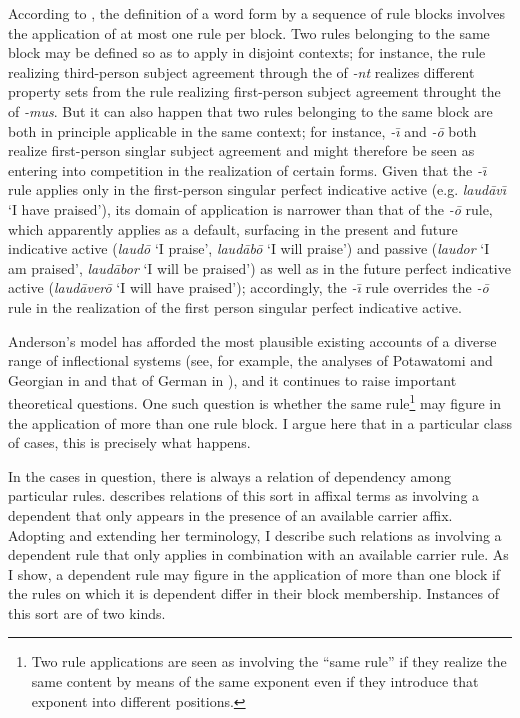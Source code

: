 \documentclass[output=paper,
modfonts
]{LSP/langsci}
\begin{document}
  According to , the definition of a word form by a sequence of rule blocks involves the application of at most one rule per block.  Two rules belonging to the same block may be defined so as to apply in disjoint contexts; for instance, the rule realizing third-person  subject agreement through the  of \textit{{}-nt} realizes different property sets from the rule realizing first-person  subject agreement throught the  of \textit{{}-mus}.  But it can also happen that two rules belonging to the same block are both in principle applicable in the same context; for instance, \textit{{}-\=\i} and \textit{{}-\=o} both realize first-person singlar subject agreement and might therefore be seen as entering into competition in the realization of certain forms.  Given that the \textit{{}-\=\i} rule\textit{} applies only in the first-person singular perfect indicative active (e.g.\textit{} \textit{laud\=av\=\i} ‘I have praised’), its domain of application is narrower than that of the \textit{{}-\=o} rule, which apparently applies as a default, surfacing in the present and future indicative active (\textit{laud\=o} ‘I praise’, \textit{laud\=ab\=o} ‘I will praise’) and passive (\textit{laudor} ‘I am praised’, \textit{laud\=abor} ‘I will be praised’) as well as in the future perfect indicative active (\textit{laud\=aver\=o} ‘I will have praised’); accordingly, the \textit{{}-\=\i} rule overrides the \textit{{}-\=o} rule in the realization of the first person singular perfect indicative active.

Anderson’s model has afforded the most plausible existing accounts of a diverse range of inflectional systems (see, for example, the analyses of Potawatomi and Georgian in \citealt{Anderson1977a,Anderson1984,Anderson1986} and that of German in \citealt{Zwicky1985a}), and it continues to raise important theoretical questions. One such question is whether the same rule\footnote{Two rule applications are seen as involving the “same rule” if they realize the same  content by means of the same exponent even if they introduce that exponent into different positions.} may figure in the application of more than one rule block.  I argue here that in a particular class of cases, this is precisely what happens.  

In the cases in question, there is always a relation of dependency among particular rules.  \citet{Harris2017} describes relations of this sort in affixal terms as involving a dependent  that only appears in the presence of an available carrier affix.  Adopting and extending her terminology, I describe such relations as involving a dependent rule that only applies in combination with an available carrier rule.  As I show, a dependent rule may figure in the application of more than one block if the rules on which it is dependent differ in their block membership.  Instances of this sort are of two kinds.
\end{document}
